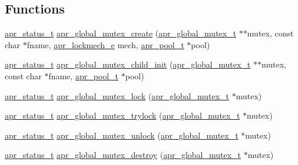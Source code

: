 \subsection*{Functions}
\begin{DoxyCompactItemize}
\item 
\hyperlink{group__apr__errno_gaf76ee4543247e9fb3f3546203e590a6c}{apr\+\_\+status\+\_\+t} \hyperlink{group___a_p_r___global_mutex_ga7a5ade1ba8ea6c7a7a61e3e719683cb0}{apr\+\_\+global\+\_\+mutex\+\_\+create} (\hyperlink{group___a_p_r___global_mutex_ga3fc7dc5b076533ee566aa4888ac35ee7}{apr\+\_\+global\+\_\+mutex\+\_\+t} $\ast$$\ast$mutex, const char $\ast$fname, \hyperlink{group__apr__proc__mutex_ga75dd95a48a1e855a87b509b522746ed4}{apr\+\_\+lockmech\+\_\+e} mech, \hyperlink{group__apr__pools_gaf137f28edcf9a086cd6bc36c20d7cdfb}{apr\+\_\+pool\+\_\+t} $\ast$pool)
\item 
\hyperlink{group__apr__errno_gaf76ee4543247e9fb3f3546203e590a6c}{apr\+\_\+status\+\_\+t} \hyperlink{group___a_p_r___global_mutex_ga51eb034bca0352075c92c08a21d4d7a0}{apr\+\_\+global\+\_\+mutex\+\_\+child\+\_\+init} (\hyperlink{group___a_p_r___global_mutex_ga3fc7dc5b076533ee566aa4888ac35ee7}{apr\+\_\+global\+\_\+mutex\+\_\+t} $\ast$$\ast$mutex, const char $\ast$fname, \hyperlink{group__apr__pools_gaf137f28edcf9a086cd6bc36c20d7cdfb}{apr\+\_\+pool\+\_\+t} $\ast$pool)
\item 
\hyperlink{group__apr__errno_gaf76ee4543247e9fb3f3546203e590a6c}{apr\+\_\+status\+\_\+t} \hyperlink{group___a_p_r___global_mutex_ga1338485664e6c2737340114cace57121}{apr\+\_\+global\+\_\+mutex\+\_\+lock} (\hyperlink{group___a_p_r___global_mutex_ga3fc7dc5b076533ee566aa4888ac35ee7}{apr\+\_\+global\+\_\+mutex\+\_\+t} $\ast$mutex)
\item 
\hyperlink{group__apr__errno_gaf76ee4543247e9fb3f3546203e590a6c}{apr\+\_\+status\+\_\+t} \hyperlink{group___a_p_r___global_mutex_ga2a6543fba6473b47e33a7b7fc2ba6935}{apr\+\_\+global\+\_\+mutex\+\_\+trylock} (\hyperlink{group___a_p_r___global_mutex_ga3fc7dc5b076533ee566aa4888ac35ee7}{apr\+\_\+global\+\_\+mutex\+\_\+t} $\ast$mutex)
\item 
\hyperlink{group__apr__errno_gaf76ee4543247e9fb3f3546203e590a6c}{apr\+\_\+status\+\_\+t} \hyperlink{group___a_p_r___global_mutex_ga16e732ae76dfe104b157e0fc543d3aa3}{apr\+\_\+global\+\_\+mutex\+\_\+unlock} (\hyperlink{group___a_p_r___global_mutex_ga3fc7dc5b076533ee566aa4888ac35ee7}{apr\+\_\+global\+\_\+mutex\+\_\+t} $\ast$mutex)
\item 
\hyperlink{group__apr__errno_gaf76ee4543247e9fb3f3546203e590a6c}{apr\+\_\+status\+\_\+t} \hyperlink{group___a_p_r___global_mutex_ga1f2cb4a1ec57089db49701e747892607}{apr\+\_\+global\+\_\+mutex\+\_\+destroy} (\hyperlink{group___a_p_r___global_mutex_ga3fc7dc5b076533ee566aa4888ac35ee7}{apr\+\_\+global\+\_\+mutex\+\_\+t} $\ast$mutex)

\end{DoxyCompactItemize}
